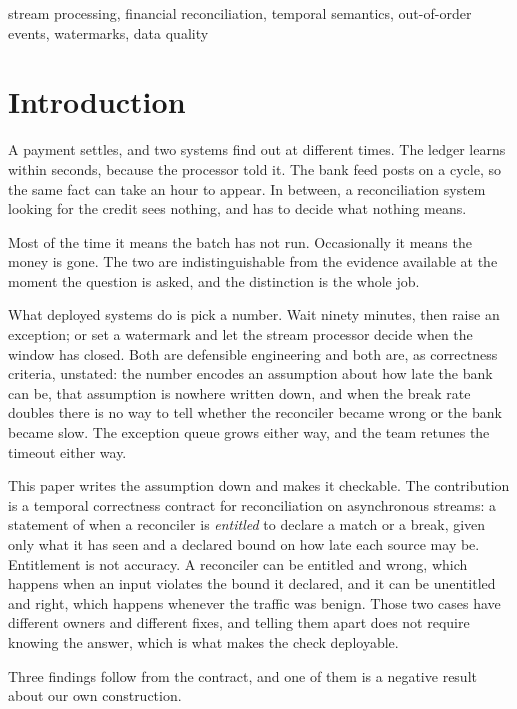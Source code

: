 \documentclass[10pt,conference]{IEEEtran}
\begin{document}
\begin{IEEEkeywords}
stream processing, financial reconciliation, temporal semantics, out-of-order
events, watermarks, data quality
\end{IEEEkeywords}

\section{Introduction}

A payment settles, and two systems find out at different times. The ledger
learns within seconds, because the processor told it. The bank feed posts on a
cycle, so the same fact can take an hour to appear. In between, a reconciliation system looking for the credit sees nothing, and has to decide
what nothing means.

Most of the time it means the batch has not run. Occasionally it means the money
is gone. The two are indistinguishable from the evidence available at the
moment the question is asked, and the distinction is the whole job.

What deployed systems do is pick a number. Wait ninety minutes, then raise an
exception; or set a watermark and let the stream processor decide when the
window has closed. Both are defensible engineering and both are, as
correctness criteria, unstated: the number encodes an assumption about how late
the bank can be, that assumption is nowhere written down, and when the break
rate doubles there is no way to tell whether the reconciler became wrong or the
bank became slow. The exception queue grows either way, and the team retunes the
timeout either way.

This paper writes the assumption down and makes it checkable. The contribution
is a temporal correctness contract for reconciliation on asynchronous streams:
a statement of when a reconciler is \emph{entitled} to declare a match or a
break, given only what it has seen and a declared bound on how late each source
may be. Entitlement is not accuracy. A reconciler can be entitled and wrong,
which happens when an input violates the bound it declared, and it can be
unentitled and right, which happens whenever the traffic was benign. Those two
cases have different owners and different fixes, and telling them apart does not require knowing the answer, which is what
makes the check deployable.

Three findings follow from the contract, and one of them is a negative result
about our own construction.
\end{document}
